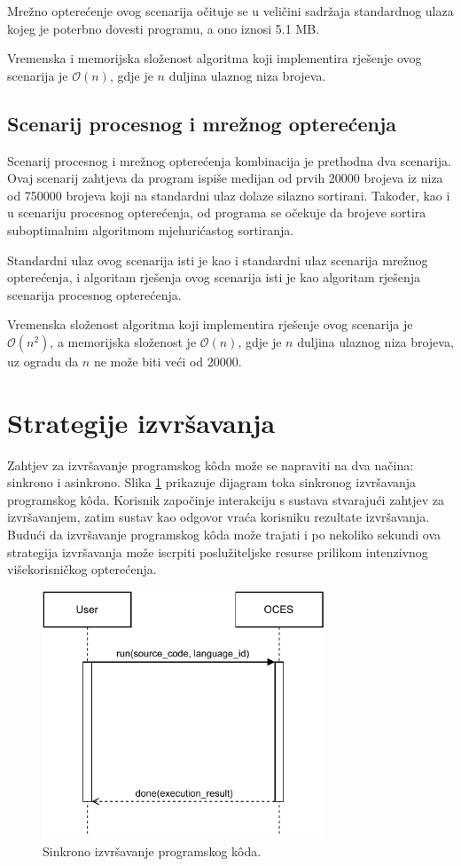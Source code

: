 \documentclass[times, utf8, diplomski]{fer}
\begin{document}
Mrežno opterećenje ovog scenarija očituje se u veličini sadržaja standardnog ulaza kojeg je poterbno dovesti programu, a ono iznosi 5.1 MB.

Vremenska i memorijska složenost algoritma koji implementira rješenje ovog scenarija je $\mathcal{O}(n)$, gdje je $n$ duljina ulaznog niza brojeva.

\subsection{Scenarij procesnog i mrežnog opterećenja}
Scenarij procesnog i mrežnog opterećenja kombinacija je prethodna dva scenarija. Ovaj scenarij zahtjeva da program ispiše medijan od prvih 20000 brojeva iz niza od 750000 brojeva koji na standardni ulaz dolaze silazno sortirani. Također, kao i u scenariju procesnog opterećenja, od programa se očekuje da brojeve sortira suboptimalnim algoritmom mjehurićastog sortiranja.

Standardni ulaz ovog scenarija isti je kao i standardni ulaz scenarija mrežnog opterećenja, i algoritam rješenja ovog scenarija isti je kao algoritam rješenja scenarija procesnog opterećenja.

Vremenska složenost algoritma koji implementira rješenje ovog scenarija je $\mathcal{O}(n^2)$, a memorijska složenost je $\mathcal{O}(n)$, gdje je $n$ duljina ulaznog niza brojeva, uz ogradu da $n$ ne može biti veći od 20000.

\section{Strategije izvršavanja}
Zahtjev za izvršavanje programskog kôda može se napraviti na dva načina: sinkrono i asinkrono. Slika \ref{fig:sync-execution} prikazuje dijagram toka sinkronog izvršavanja programskog kôda. Korisnik započinje interakciju s sustava stvarajući zahtjev za izvršavanjem, zatim sustav kao odgovor vraća korisniku rezultate izvršavanja. Budući da izvršavanje programskog kôda može trajati i po nekoliko sekundi ova strategija izvršavanja može iscrpiti poslužiteljske resurse prilikom intenzivnog višekorisničkog opterećenja.

\begin{figure}[htb]
	\centering
	\includegraphics[width=0.75\textwidth]{images/sync-execution.pdf}
	\caption{
		Sinkrono izvršavanje programskog kôda.
	}
	\label{fig:sync-execution}
\end{figure}
\end{document}
